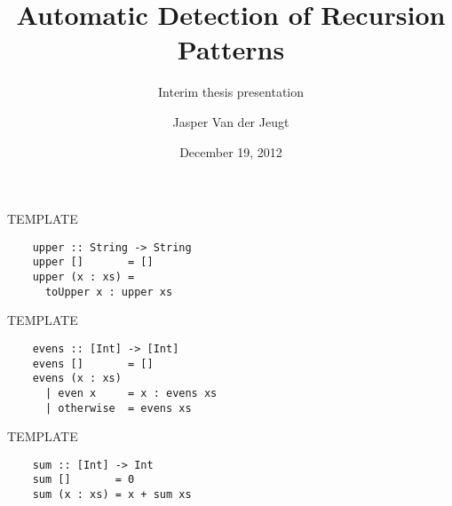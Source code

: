 \documentclass[20pt]{beamer}
\begin{document}
\title{Automatic Detection of Recursion Patterns}
\subtitle{Interim thesis presentation}
\author{Jasper Van der Jeugt}
\date{December 19, 2012}

\begin{frame}[plain]
    \titlepage
\end{frame}


\begin{frame}[fragile]{TEMPLATE}
    \begin{lstlisting}
    upper :: String -> String
    upper []       = []
    upper (x : xs) =
      toUpper x : upper xs
    \end{lstlisting}
\end{frame}

\begin{frame}[fragile]{TEMPLATE}
    \begin{lstlisting}
    evens :: [Int] -> [Int]
    evens []       = []
    evens (x : xs)
      | even x     = x : evens xs
      | otherwise  = evens xs
    \end{lstlisting}
\end{frame}

\begin{frame}[fragile]{TEMPLATE}
    \begin{lstlisting}
    sum :: [Int] -> Int
    sum []       = 0
    sum (x : xs) = x + sum xs
    \end{lstlisting}
\end{frame}
\end{document}
